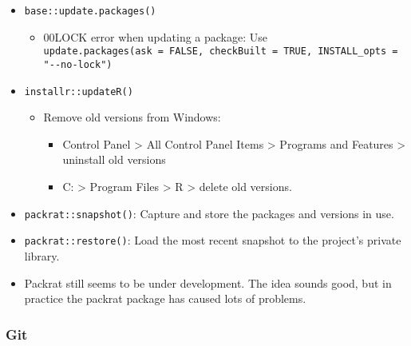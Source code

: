 \documentclass[
]{book}
\providecommand{\tightlist}{%
  \setlength{\itemsep}{0pt}\setlength{\parskip}{0pt}}
\begin{document}
\begin{itemize}
\tightlist
\item
  \texttt{base::update.packages()}

  \begin{itemize}
  \tightlist
  \item
    00LOCK error when updating a package: Use \texttt{update.packages(ask\ =\ FALSE,\ checkBuilt\ =\ TRUE,\ INSTALL\_opts\ =\ "-\/-no-lock")}
  \end{itemize}
\item
  \texttt{installr::updateR()}

  \begin{itemize}
  \tightlist
  \item
    Remove old versions from Windows:

    \begin{itemize}
    \tightlist
    \item
      Control Panel \textgreater{} All Control Panel Items \textgreater{} Programs and Features \textgreater{} uninstall old versions
    \item
      C: \textgreater{} Program Files \textgreater{} R \textgreater{} delete old versions.
    \end{itemize}
  \end{itemize}
\item
  \texttt{packrat::snapshot()}: Capture and store the packages and versions in use.
\item
  \texttt{packrat::restore()}: Load the most recent snapshot to the project's private library.
\item
  Packrat still seems to be under development. The idea sounds good, but in practice the packrat package has caused lots of problems.
\end{itemize}

\hypertarget{git}{%
\subsubsection{Git}\label{git}}
\end{document}
